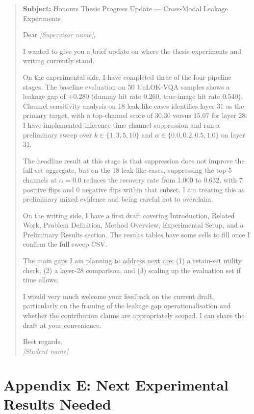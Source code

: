 \documentclass[12pt, a4paper]{article}
\newcommand{\placeholder}[1]{\textcolor{gray}{\textit{[#1]}}}
\begin{document}
\begin{quote}
\noindent
\textbf{Subject:} Honours Thesis Progress Update — Cross-Modal Leakage Experiments

\medskip
\noindent
Dear \placeholder{Supervisor name},

I wanted to give you a brief update on where the thesis experiments and writing
currently stand.

On the experimental side, I have completed three of the four pipeline stages.
The baseline evaluation on 50 UnLOK-VQA samples shows a leakage gap of $+0.280$
(dummy hit rate 0.260, true-image hit rate 0.540).
Channel sensitivity analysis on 18 leak-like cases identifies layer 31 as the
primary target, with a top-channel score of 30.30 versus 15.07 for layer 28.
I have implemented inference-time channel suppression and run a preliminary
sweep over $k \in \{1,3,5,10\}$ and $\alpha \in \{0.0,0.2,0.5,1.0\}$ on layer 31.

The headline result at this stage is that suppression does not improve the full-set
aggregate, but on the 18 leak-like cases, suppressing the top-5 channels at
$\alpha=0.0$ reduces the recovery rate from 1.000 to 0.632, with 7 positive flips
and 0 negative flips within that subset.
I am treating this as preliminary mixed evidence and being careful not to overclaim.

On the writing side, I have a first draft covering Introduction, Related Work,
Problem Definition, Method Overview, Experimental Setup, and a Preliminary Results
section.
The results tables have some cells to fill once I confirm the full sweep CSV.

The main gaps I am planning to address next are: (1) a retain-set utility check,
(2) a layer-28 comparison, and (3) scaling up the evaluation set if time allows.

I would very much welcome your feedback on the current draft, particularly on
the framing of the leakage gap operationalisation and whether the contribution
claims are appropriately scoped.
I can share the draft at your convenience.

Best regards,\\
\placeholder{Student name}
\end{quote}


\section*{Appendix E: Next Experimental Results Needed}
\label{app:roadmap}
\end{document}
